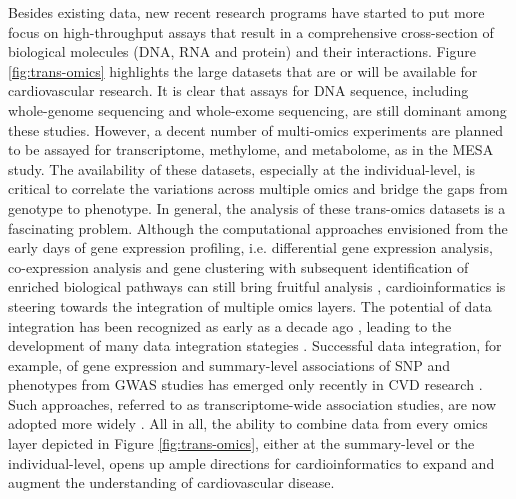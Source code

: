\documentclass[letter]{bioinfo}
\begin{document}
	Besides existing data, new recent research programs have started to put more focus on high-throughput assays that result in a comprehensive cross-section of biological molecules (DNA, RNA and protein) and their interactions.  Figure \ref{fig:trans-omics} highlights the large datasets that are or will be available for cardiovascular research. It is clear that assays for DNA sequence, including whole-genome sequencing and whole-exome sequencing, are still dominant among these studies. However, a decent number of multi-omics experiments are planned to be assayed for transcriptome, methylome, and metabolome, as in the MESA study. The availability of these datasets, especially at the individual-level, is critical to correlate the variations across multiple omics and bridge the gaps from genotype to phenotype.  In general, the analysis of these trans-omics datasets is a fascinating problem. Although the computational approaches envisioned from the early days of gene expression profiling, i.e. differential gene expression analysis, co-expression analysis and gene clustering with subsequent identification of enriched biological pathways \citep{Claverie:1999:Computational} can still bring fruitful analysis \citep{Santolini:2018:personalized}, cardioinformatics is steering towards the integration of multiple omics layers. The potential of data integration has been recognized as early as a decade ago \cite{Hawkins:2010:Nextgeneration}, leading to the development of many data integration stategies \citep{Ritchie:2015:Methods}. Successful data integration, for example, of gene expression and summary-level associations of SNP and phenotypes from GWAS studies has emerged only recently in CVD research \citep{Gusev:2016:Integrative}. Such approaches, referred to as transcriptome-wide association studies, are now adopted more widely \citep{Klarin:2018:Genetics}. All in all, the ability to combine data from every omics layer depicted in Figure \ref{fig:trans-omics}, either at the summary-level or the individual-level, opens up ample directions for cardioinformatics to expand and augment the understanding of cardiovascular disease.
	
\end{document}
